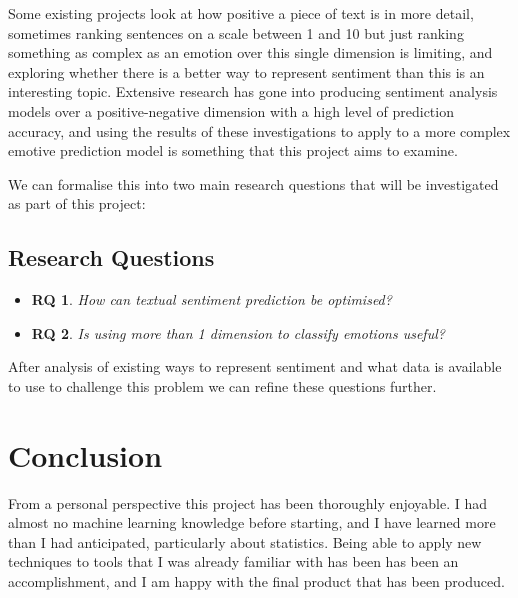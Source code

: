 \documentclass[11pt]{article}
\newtheorem{theorem}{RQ}
\begin{document}
Some existing projects look at how positive a piece of text is in more detail, sometimes ranking sentences on a scale between 1 and 10 but just ranking something as complex as an emotion over this single dimension is limiting, and exploring whether there is a better way to represent sentiment than this is an interesting topic.
Extensive research has gone into producing sentiment analysis models over a positive-negative dimension with a high level of prediction accuracy, and using the results of these investigations to apply to a more complex emotive prediction model is something that this project aims to examine.

We can formalise this into two main research questions that will be investigated as part of this project:

\subsection{Research Questions}


\begin{itemize}
    \item   \begin{theorem} 
                \label{RQ1}
                \textnormal{How can textual sentiment prediction be optimised?}
            \end{theorem}   
    \item   \begin{theorem} 
                \label{RQ2}
                \textnormal{Is using more than 1 dimension to classify emotions useful?}
            \end{theorem} 
\end{itemize}

After analysis of existing ways to represent sentiment and what data is available to use to challenge this problem we can refine these questions further. 

\pagebreak


\section{Conclusion}

From a personal perspective this project has been thoroughly enjoyable. I had almost no machine learning knowledge before starting, and I have learned more than I had anticipated, particularly about statistics. Being able to apply new techniques to tools that I was already familiar with has been has been an accomplishment, and I am happy with the final product that has been produced. 
\end{document}
